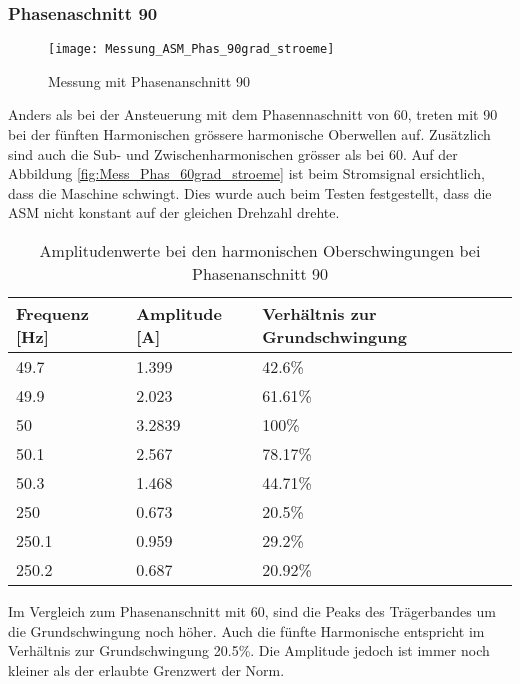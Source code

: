 \subsubsection*{Phasenaschnitt 90\textdegree}
\begin{figure}[ht!]
	\centering
	\texttt{[image: Messung\_ASM\_Phas\_90grad\_stroeme]}	
	\caption{Messung mit Phasenanschnitt 90\textdegree}\label{fig:Mess_Phas_90grad_stroeme}
\end{figure}
Anders als bei der Ansteuerung mit dem Phasennaschnitt von 60\textdegree, treten mit 90\textdegree \hspace{0.02cm} bei der fünften Harmonischen grössere harmonische Oberwellen auf. Zusätzlich sind auch die Sub- und Zwischenharmonischen grösser als bei 60\textdegree. Auf der Abbildung \ref{fig:Mess_Phas_60grad_stroeme} ist beim Stromsignal ersichtlich, dass die Maschine schwingt. Dies wurde auch beim Testen festgestellt, dass die ASM nicht konstant auf der gleichen Drehzahl drehte.  
\begin{table}[ht!]
	\centering
	\begin{tabular}{|l|l|l|}
		\hline
		Frequenz {[}Hz{]} & Amplitude {[}A{]} & Verhältnis zur Grundschwingung	\\ \hline
		49.7              & 1.399             & 42.6\%							\\ \hline
		49.9              & 2.023             & 61.61\%							\\ \hline
		50                & 3.2839            & 100\%							\\ \hline
		50.1              & 2.567             & 78.17\%							\\ \hline
		50.3              & 1.468             & 44.71\%							\\ \hline
		250               & 0.673             & 20.5\%							\\ \hline
		250.1             & 0.959             & 29.2\%							\\ \hline
		250.2             & 0.687             & 20.92\%							\\ \hline
	\end{tabular}
	\caption{Amplitudenwerte bei den harmonischen Oberschwingungen bei Phasenanschnitt 90\textdegree}\label{tab:Phas_90_ASM_stroeme}
\end{table}

Im Vergleich zum Phasenanschnitt mit 60\textdegree, sind die Peaks des Trägerbandes um die Grundschwingung noch höher. Auch die fünfte Harmonische entspricht im Verhältnis zur Grundschwingung 20.5\%. Die Amplitude jedoch ist immer noch kleiner als der erlaubte Grenzwert der Norm. 


